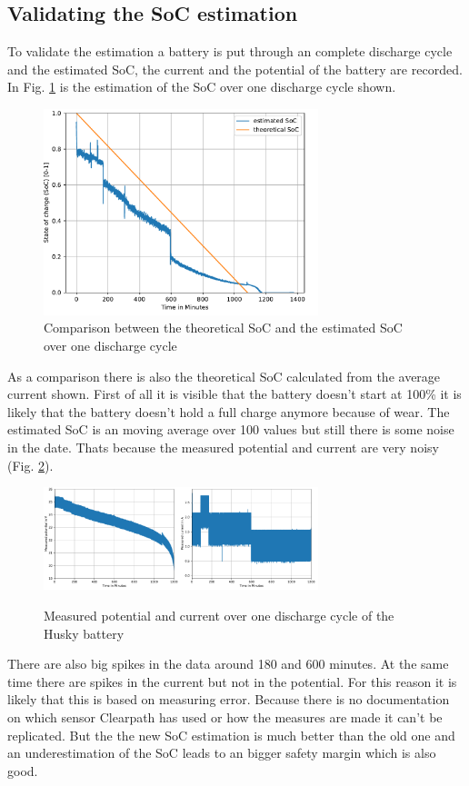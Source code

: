 \documentclass[conference]{IEEEtran}
\begin{document}
\subsection{Validating the SoC estimation}
To validate the estimation a battery is put through an complete discharge cycle and the estimated SoC, the current and the potential of the battery are recorded.
In Fig. \ref{fig:SoCUeberZeit} is the estimation of the SoC over one discharge cycle shown.
\begin{figure}[htbp]
    \centerline{\includegraphics[width=8cm]{Pictures/SoCUeberZeit.pdf}}
    \caption{Comparison between the theoretical SoC and the estimated SoC over one discharge cycle}
    \label{fig:SoCUeberZeit}
\end{figure}
As a comparison there is also the theoretical SoC calculated from the average current shown.
First of all it is visible that the battery doesn't start at 100\% it is likely that the battery doesn't hold a full charge anymore because of wear.
The estimated SoC is an moving average over 100 values but still there is some noise in the date. Thats because the measured potential and current are very noisy (Fig. \ref{fig:SpannungStromUeberZeit}).
\begin{figure}[htbp]
    \centerline{\includegraphics[width=4cm]{Pictures/SpannungUeberZeit.pdf}\includegraphics[width=4cm]{Pictures/StormUeberZeit.pdf}}
    \caption{Measured potential and current over one discharge cycle of the Husky battery}
    \label{fig:SpannungStromUeberZeit}
\end{figure}
There are also big spikes in the data around 180 and 600 minutes. At the same time there are spikes in the current but not in the potential.
For this reason it is likely that this is based on measuring error. Because there is no documentation on which sensor Clearpath has used or how the measures are made it can't be replicated.
But the the new SoC estimation is much better than the old one and an underestimation of the SoC leads to an bigger safety margin which is also good.
\end{document}
